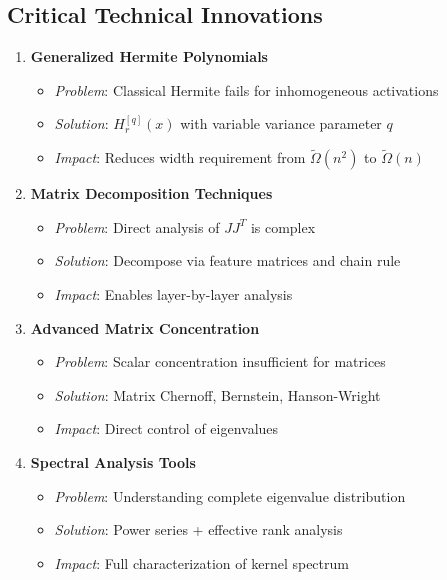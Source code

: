 \documentclass{article}
\begin{document}
\subsection{Critical Technical Innovations}

\begin{enumerate}
    \item \textbf{Generalized Hermite Polynomials}
    \begin{itemize}
        \item \textit{Problem}: Classical Hermite fails for inhomogeneous activations
        \item \textit{Solution}: $H_r^{[q]}(x)$ with variable variance parameter $q$
        \item \textit{Impact}: Reduces width requirement from $\tilde{\Omega}(n^2)$ to $\tilde{\Omega}(n)$
    \end{itemize}
    
    \item \textbf{Matrix Decomposition Techniques}
    \begin{itemize}
        \item \textit{Problem}: Direct analysis of $JJ^T$ is complex
        \item \textit{Solution}: Decompose via feature matrices and chain rule
        \item \textit{Impact}: Enables layer-by-layer analysis
    \end{itemize}
    
    \item \textbf{Advanced Matrix Concentration}
    \begin{itemize}
        \item \textit{Problem}: Scalar concentration insufficient for matrices
        \item \textit{Solution}: Matrix Chernoff, Bernstein, Hanson-Wright
        \item \textit{Impact}: Direct control of eigenvalues
    \end{itemize}
    
    \item \textbf{Spectral Analysis Tools}
    \begin{itemize}
        \item \textit{Problem}: Understanding complete eigenvalue distribution
        \item \textit{Solution}: Power series + effective rank analysis
        \item \textit{Impact}: Full characterization of kernel spectrum
    \end{itemize}
\end{enumerate}
\end{document}
